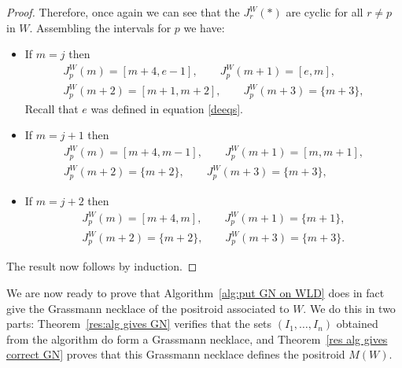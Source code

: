 \documentclass[11pt]{article}
\theoremstyle{remark}
\theoremstyle{definition}
\begin{document}
\begin{proof}
Therefore, once again we can see that the $J_r^{W}(*)$ are cyclic for all $r\neq p$ in $W$.  Assembling the intervals for $p$ we have:
\begin{itemize}
\item If $m=j$ then
\begin{gather*}J_p^{W}(m) = [m+4,e-1], \qquad  J_p^{W}(m+1) = [e,m], \\  J_p^{W}(m+2) = [m+1,m+2], \qquad  J_p^{W}(m+3) = \{m+3\},\end{gather*}
Recall that $e$ was defined in equation \eqref{deeqs}.
\item If $m=j+1$ then
\begin{gather*}J_p^{W}(m) = [m+4,m-1], \qquad J_p^{W}(m+1) = [m,m+1], \\  J_p^{W}(m+2) = \{m+2\}, \qquad  J_p^{W}(m+3) = \{m+3\},\end{gather*}
\item If $m=j+2$ then
\begin{gather*}J_p^{W}(m) = [m+4,m], \qquad  J_p^{W}(m+1) = \{m+1\}, \\  J_p^{W}(m+2) = \{m+2\}, \qquad  J_p^{W}(m+3) = \{m+3\}.\end{gather*}
\end{itemize}
The result now follows by induction.
\end{proof}



We are now ready to prove that Algorithm~\ref{alg:put GN on WLD} does in fact give the Grassmann necklace of the positroid associated to $W$. We do this in two parts: Theorem~\ref{res:alg gives GN} verifies that the sets $(I_1,\dots,I_n)$ obtained from the algorithm do form a Grassmann necklace, and Theorem~\ref{res alg gives correct GN} proves that this Grassmann necklace defines the positroid $M(W)$.
\end{document}
